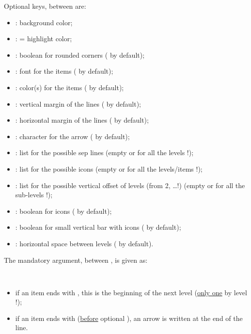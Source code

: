 \documentclass[11pt,a4paper]{ltxdoc}
\begin{document}
Optional keys, between \MontreCode{[...]} are:

\begin{itemize}
	\item {}: background color;
	\item {}: = highlight color;
	\item {}: boolean for rounded corners ( by default);
	\item {}: font for the items ( by default);
	\item {}: color(s) for the items ( by default);
	\item {}: vertical margin of the lines (\MontreCode{6pt} by default);
	\item {}: horizontal margin of the lines (\MontreCode{12pt} by default);
	\item {}: character for the arrow ( by default);
	\item {}: list for the possible sep lines (empty or for all the levels !);
	\item {}: list for the possible icons (empty or for all the levels/items !);
	\item {}: list for the possible vertical offset of levels (from 2, \ldots !) (empty or for all the sub-levels !);
	\item {}: boolean for icons ( by default);
	\item {}: boolean for small vertical bar with icons ( by default);
	\item {}: horizontal space between levels ( by default).
\end{itemize}

\medskip

The mandatory argument, between , is given as:

\smallskip

\hfill{}\hfill~

\begin{itemize}
	\item if an item ends with \MontreCode{(*)}, this is the beginning of the next level (\underline{only one} by level !);
	\item if an item ends with \MontreCode{(>)} (\underline{before} optional \MontreCode{(*)}), an arrow is written at the end of the line.
\end{itemize}
\end{document}
